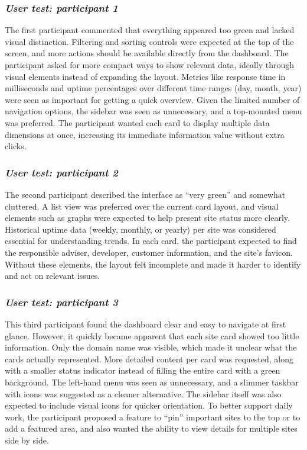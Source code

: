 \subsubsection{\textit{\textbf{User test: participant 1}}}
The first participant commented that everything appeared too green and lacked visual distinction. Filtering and sorting controls were expected at the top of the screen, and more actions should be available directly from the dashboard. The participant asked for more compact ways to show relevant data, ideally through visual elements instead of expanding the layout. Metrics like response time in milliseconds and uptime percentages over different time ranges (day, month, year) were seen as important for getting a quick overview. Given the limited number of navigation options, the sidebar was seen as unnecessary, and a top-mounted menu was preferred. The participant wanted each card to display multiple data dimensions at once, increasing its immediate information value without extra clicks.

\subsubsection{\textit{\textbf{User test: participant 2}}}
The second participant described the interface as “very green” and somewhat cluttered. A list view was preferred over the current card layout, and visual elements such as graphs were expected to help present site status more clearly. Historical uptime data (weekly, monthly, or yearly) per site was considered essential for understanding trends. In each card, the participant expected to find the responsible adviser, developer, customer information, and the site’s favicon. Without these elements, the layout felt incomplete and made it harder to identify and act on relevant issues.

\subsubsection{\textit{\textbf{User test: participant 3}}}
This third participant found the dashboard clear and easy to navigate at first glance. However, it quickly became apparent that each site card showed too little information. Only the domain name was visible, which made it unclear what the cards actually represented. More detailed content per card was requested, along with a smaller status indicator instead of filling the entire card with a green background. The left-hand menu was seen as unnecessary, and a slimmer taskbar with icons was suggested as a cleaner alternative. The sidebar itself was also expected to include visual icons for quicker orientation. To better support daily work, the participant proposed a feature to “pin” important sites to the top or to add a featured area, and also wanted the ability to view details for multiple sites side by side.

